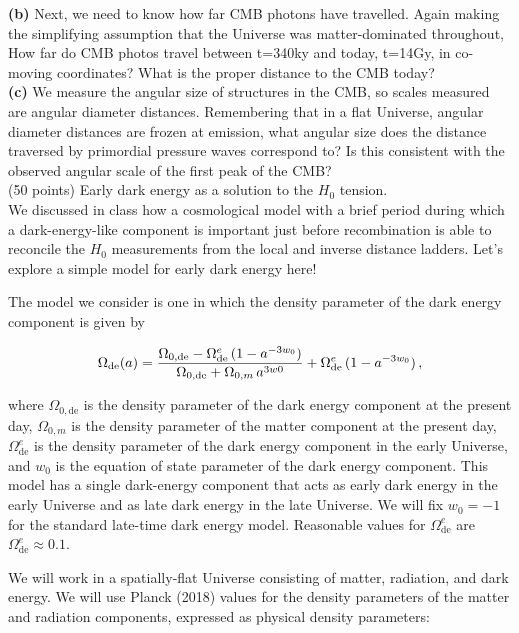 \documentclass[12pt]{article}
\begin{document}
{\bf (b)} Next, we need to know how far CMB photons have travelled.
Again making the simplifying assumption that the Universe was matter-dominated throughout,
How far do CMB photos travel between t=340ky and today, t=14Gy, in co-moving coordinates?
What is the proper distance to the CMB today?\\

{\bf (c)} We measure the angular size of structures in the CMB, so scales measured are angular diameter distances.
Remembering that in a flat Universe, angular diameter distances are frozen at emission,
what angular size does the distance traversed by primordial pressure waves correspond to? Is this consistent with the observed angular scale of the first peak of the CMB?\\

 (50 points) Early dark energy as a solution to the $H_0$ tension.\\

We discussed in class how a cosmological model with a brief period during which a 
dark-energy-like component is important just before recombination is able to reconcile
the $H_0$ measurements from the local and inverse distance ladders. Let's explore a simple 
model for early dark energy here!

The model we consider is one in which the density parameter of the dark energy component 
is given by

\begin{equation}
    \Omega_\mathrm{de}(a) = {\Omega_{0,\mathrm{de}}-\Omega^e_\mathrm{de}\,(1-a^{-3w_0})\over \Omega_{0,\mathrm{de}}+\Omega_{0,m}\,a^{3w0}}+\Omega^e_\mathrm{de}\,(1-a^{-3w_0})\,,
\end{equation}

where $\Omega_{0,\mathrm{de}}$ is the density parameter of the dark energy component at the present day,
$\Omega_{0,m}$ is the density parameter of the matter component at the present day,
$\Omega^e_\mathrm{de}$ is the density parameter of the dark energy component in the early Universe,
and $w_0$ is the equation of state parameter of the dark energy component. This model has 
a single dark-energy component that acts as early dark energy in the early Universe and 
as late dark energy in the late Universe. We will fix $w_0=-1$ for the standard late-time dark energy model.
Reasonable values for $\Omega^e_\mathrm{de}$ are $\Omega^e_\mathrm{de} \approx 0.1$.

We will work in a spatially-flat Universe consisting of matter, radiation, and dark energy. 
We will use Planck (2018) values for the density parameters of the matter and radiation 
components, expressed as physical density parameters:
\end{document}
